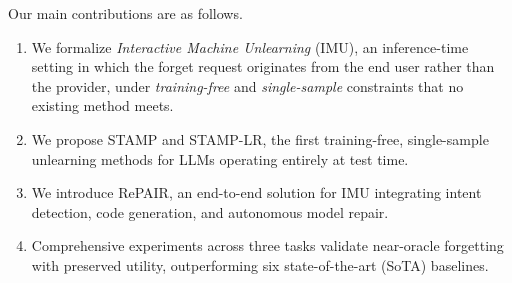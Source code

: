 Our main contributions are as follows.
\begin{enumerate}
    \item We formalize \textit{Interactive Machine Unlearning} (IMU), an inference-time setting in which the forget request originates from the end user rather than the provider, under \textit{training-free} and \textit{single-sample} constraints that no existing method meets.

    \item We propose STAMP and STAMP-LR, the first training-free, single-sample unlearning methods for LLMs operating entirely at test time.

    \item We introduce RePAIR, an end-to-end solution for IMU integrating intent detection, code generation, and autonomous model repair.

    \item Comprehensive experiments across three tasks validate near-oracle forgetting with preserved utility, outperforming six state-of-the-art (SoTA) baselines.
\end{enumerate}
